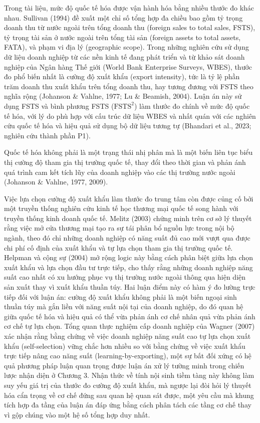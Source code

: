 \documentclass[
  a4paper,
  13pt]{extreport}
\begin{document}
Trong tài liệu, mức độ quốc tế hóa được vận hành hóa bằng nhiều thước đo
khác nhau. Sullivan (1994) đề xuất một chỉ số tổng hợp đa chiều bao gồm
tỷ trọng doanh thu từ nước ngoài trên tổng doanh thu (foreign sales to
total sales, FSTS), tỷ trọng tài sản ở nước ngoài trên tổng tài sản
(foreign assets to total assets, FATA), và phạm vi địa lý (geographic
scope). Trong những nghiên cứu sử dụng dữ liệu doanh nghiệp từ các nền
kinh tế đang phát triển và từ khảo sát doanh nghiệp của Ngân hàng Thế
giới (World Bank Enterprise Surveys, WBES), thước đo phổ biến nhất là
cường độ xuất khẩu (export intensity), tức là tỷ lệ phần trăm doanh thu
xuất khẩu trên tổng doanh thu, hay tương đương với FSTS theo nghĩa rộng
(Johanson \& Vahlne, 1977; Lu \& Beamish, 2004). Luận án này sử dụng
FSTS và bình phương FSTS (\(\text{FSTS}^2\)) làm thước đo chính về mức
độ quốc tế hóa, với lý do phù hợp với cấu trúc dữ liệu WBES và nhất quán
với các nghiên cứu quốc tế hóa và hiệu quả sử dụng bộ dữ liệu tương tự
(Bhandari et al., 2023; nghiên cứu thành phần P1).

Quốc tế hóa không phải là một trạng thái nhị phân mà là một biến liên
tục biểu thị cường độ tham gia thị trường quốc tế, thay đổi theo thời
gian và phản ánh quá trình cam kết tích lũy của doanh nghiệp vào các thị
trường nước ngoài (Johanson \& Vahlne, 1977, 2009).

Việc lựa chọn cường độ xuất khẩu làm thước đo trung tâm còn được củng cố
bởi một truyền thống nghiên cứu kinh tế học thương mại quốc tế song hành
với truyền thống kinh doanh quốc tế. Melitz (2003) chứng minh trên cơ sở
lý thuyết rằng việc mở cửa thương mại tạo ra sự tái phân bổ nguồn lực
trong nội bộ ngành, theo đó chỉ những doanh nghiệp có năng suất đủ cao
mới vượt qua được chi phí cố định của xuất khẩu và tự lựa chọn tham gia
thị trường quốc tế. Helpman và cộng sự (2004) mở rộng logic này bằng
cách phân biệt giữa lựa chọn xuất khẩu và lựa chọn đầu tư trực tiếp, cho
thấy rằng những doanh nghiệp năng suất cao nhất có xu hướng phục vụ thị
trường nước ngoài thông qua hiện diện sản xuất thay vì xuất khẩu thuần
túy. Hai luận điểm này có hàm ý đo lường trực tiếp đối với luận án:
cường độ xuất khẩu không phải là một biến ngoại sinh thuần túy mà gắn
liền với năng suất nội tại của doanh nghiệp, do đó quan hệ giữa quốc tế
hóa và hiệu quả có thể vừa phản ánh cơ chế nhân quả vừa phản ánh cơ chế
tự lựa chọn. Tổng quan thực nghiệm cấp doanh nghiệp của Wagner (2007)
xác nhận rằng bằng chứng về việc doanh nghiệp năng suất cao tự lựa chọn
xuất khẩu (self-selection) vững chắc hơn nhiều so với bằng chứng về việc
xuất khẩu trực tiếp nâng cao năng suất (learning-by-exporting), một sự
bất đối xứng có hệ quả phương pháp luận quan trọng được luận án xử lý
tường minh trong chiến lược nhận diện ở Chương 3. Nhận thức về tính nội
sinh tiềm tàng này không làm suy yếu giá trị của thước đo cường độ xuất
khẩu, mà ngược lại đòi hỏi lý thuyết hóa cẩn trọng về cơ chế đứng sau
quan hệ quan sát được, một yêu cầu mà khung tích hợp đa tầng của luận án
đáp ứng bằng cách phân tách các tầng cơ chế thay vì gộp chúng vào một hệ
số tổng hợp duy nhất.
\end{document}
